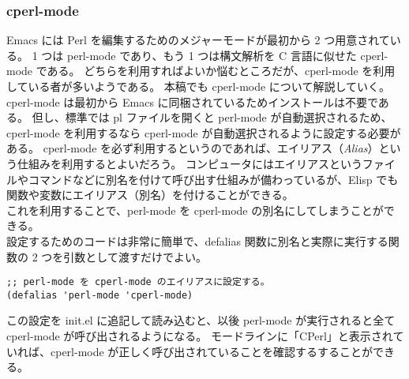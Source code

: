 \subsubsection{cperl-mode}
Emacs には Perl を編集するためのメジャーモードが最初から 2 つ用意されている。
1 つは perl-mode であり、もう 1 つは構文解析を C 言語に似せた cperl-mode である。
どちらを利用すればよいか悩むところだが、cperl-mode を利用している者が多いようである。
本稿でも cperl-mode について解説していく。\\

cperl-mode は最初から Emacs に同梱されているためインストールは不要である。
但し、標準では pl ファイルを開くと perl-mode が自動選択されるため、cperl-mode を利用するなら cperl-mode が自動選択されるように設定する必要がある。
cperl-mode を必ず利用するというのであれば、エイリアス（\emph{Alias}）という仕組みを利用するとよいだろう。
コンピュータにはエイリアスというファイルやコマンドなどに別名を付けて呼び出す仕組みが備わっているが、Elisp でも関数や変数にエイリアス（別名）を付けることができる。\\

これを利用することで、perl-mode を cperl-mode の別名にしてしまうことができる。\\

設定するためのコードは非常に簡単で、defalias 関数に別名と実際に実行する関数の 2 つを引数として渡すだけでよい。
\begin{mdframed}[roundcorner=0.50zw,leftmargin=3.00zw,rightmargin=3.00zw,skipabove=0.40zw,skipbelow=0.40zw,innertopmargin=4.00pt,innerbottommargin=4.00pt,innerleftmargin=5.00pt,innerrightmargin=5.00pt,linecolor=gray!020,linewidth=0.50pt,backgroundcolor=gray!20]
\begin{verbatim}
;; perl-mode を cperl-mode のエイリアスに設定する。
(defalias 'perl-mode 'cperl-mode)
\end{verbatim}
\end{mdframed}
この設定を init.el に追記して読み込むと、以後 perl-mode が実行されると全て cperl-mode が呼び出されるようになる。
モードラインに「CPerl」と表示されていれば、cperl-mode が正しく呼び出されていることを確認するすることができる。
